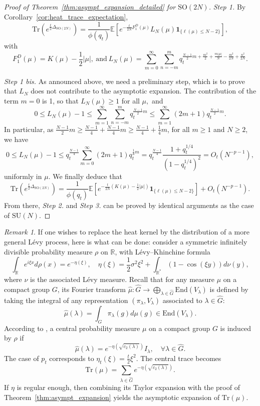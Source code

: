 \documentclass[11pt,a4paper,reqno]{article}
\theoremstyle{definition}
\theoremstyle{remark}
\newtheorem{remark}[theorem]{Remark}
\newcommand\SU{{\mathrm{SU}}}
\newcommand\SO{{\mathrm{SO}}}
\newcommand\R{\mathbb{R}}
\newcommand\Tr{\mathrm{Tr}}
\newcommand\E{\mathbb{E}}
\begin{document}
\begin{proof}[Proof of Theorem~\ref{thm:asympt_expansion_detailed} for $\SO(2N)$]
\emph{Step 1.} By Corollary~\ref{cor:heat_trace_expectation},
\[
\Tr(e^{\frac{t}{2}\Delta_{\SO(2N)}})=   \frac{1}{\phi(q_t)}\E\left[e^{-\frac{t}{2N}F_1^D(\mu)} L_N(\mu)\mathbf{1}_{\{\ell(\mu)\leq N-2\}}\right],
\]
with
\begin{equation}\label{def:LN}
F_1^D(\mu) = K(\mu)-\frac{1}{2}\vert\mu\vert,\ \text{and}\ L_N(\mu) = \sum_{m=0}^\infty\sum_{n=-m}^m q_t^{\frac{N-1}{2} m + \frac{m^2}{2} + \frac{m|\mu|}{N} -\frac{m^2}{2N}+ \frac{n^2}{2N}}.
\end{equation}

\emph{Step 1 bis.} As announced above, we need a preliminary step, which is to prove that $L_N$ does not contribute to the asymptotic expansion. The contribution of the term $m=0$ is 1, so that $L_N(\mu)\geq 1$ for all $\mu,$ and
\[
0 \leq L_N(\mu) -1 \leq \sum_{m=1}^\infty \sum_{n=-m}^m q_t^{\frac{N-1}{2}m} \leq\sum_{m=1}^\infty(2m+1)q_t^{\frac{N-1}{2}m}.
\]
In particular, as $\frac{N-1}{2}m\geq\frac{N-1}{4}+\frac{N-1}{4}m\geq\frac{N-1}{4}+\frac14m$, for all $m\geq 1$ and $N\geq 2$, we have
\[
0\leq L_N(\mu)-1\leq q_t^{\frac{N-1}{4}}\sum_{m=0}^\infty(2m+1)q_t^{\frac{1}{4}m}=q_t^{\frac{N-1}{4}}\frac{1+q_t^{1/4}}{(1-q_t^{1/4})^2}=O_t(N^{-p-1}),
\]
uniformly in $\mu$. We finally deduce that
\[
\Tr(e^{\frac{t}{2}\Delta_{\SO(2N)}})=  \frac{1}{\phi(q_t)}\E\left[ e^{-\frac{t}{2N}(K(\mu)-\frac{1}{2}\vert\mu\vert)} \mathbf{1}_{\{\ell(\mu)\leq N-2\}}\right] + O_t(N^{-p-1}).
\]
From there, \emph{Step 2.} and \emph{Step 3.} can be proved by identical arguments as the case of $\SU(N)$.
\end{proof}

\begin{remark}\label{rmk:extension_Levy}
If one wishes to replace the heat kernel by the distribution of a more general L\'evy process, here is what can be done: consider a symmetric infinitely divisible probability measure $\rho$ on $\R$, with L\'evy--Khinchine formula
\[
\int_\R e^{i\xi x}d\rho(x)=e^{-\eta(\xi)},\quad \eta(\xi)=\frac12\sigma^2 \xi^2+\int_{\R^*}(1-\cos(\xi y))d\nu(y),
\]
where $\nu$ is the associated L\'evy measure. Recall that for any measure $\mu$ on a compact group $G$, its Fourier transform $\widehat{\mu}:\widehat{G}\to\bigoplus_{\lambda\in\widehat{G}}\mathrm{End}(V_\lambda)$ is defined by taking the integral of any representation $(\pi_\lambda,V_\lambda)$ associated to $\lambda\in\widehat{G}$:
\[
\widehat{\mu}(\lambda)=\int_G\pi_\lambda(g)d\mu(g)\in\mathrm{End}(V_\lambda).
\]
According to \cite{App}, a central probability measure $\mu$ on a compact group $G$ is induced by $\rho$ if
\[
\widehat{\mu}(\lambda)=e^{-\eta(\sqrt{c_2(\lambda)})}I_\lambda,\quad \forall \lambda\in\widehat{G}.
\]
The case of $p_t$ corresponds to $\eta_t(\xi)=\frac{t}{2}\xi^2$. The central trace becomes
\[
\Tr(\mu)=\sum_{\lambda\in\widehat{G}}e^{-\eta(\sqrt{c_2(\lambda)})}.
\]
If $\eta$ is regular enough, then combining its Taylor expansion with the proof of Theorem~\ref{thm:asympt_expansion} yields the asymptotic expansion of $\Tr(\mu)$.
\end{remark}
\end{document}
